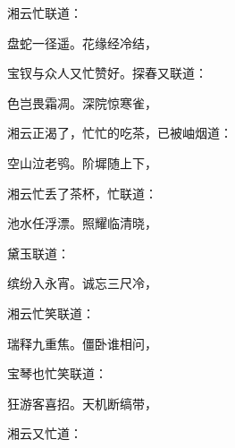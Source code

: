 \begin{parag}
    湘云忙联道：
\end{parag}
\begin{poem}
    \begin{pl} 盘蛇一径遥。花缘经冷结，\end{pl}
\end{poem}
\begin{parag}
    宝钗与众人又忙赞好。探春又联道：
\end{parag}
\begin{poem}
    \begin{pl} 色岂畏霜凋。深院惊寒雀，\end{pl}
\end{poem}
\begin{parag}
    湘云正渴了，忙忙的吃茶，已被岫烟道：
\end{parag}
\begin{poem}
    \begin{pl} 空山泣老鸮。阶墀随上下，\end{pl}
\end{poem}
\begin{parag}
    湘云忙丢了茶杯，忙联道：
\end{parag}
\begin{poem}
    \begin{pl} 池水任浮漂。照耀临清晓，\end{pl}
\end{poem}
\begin{parag}
    黛玉联道：
\end{parag}
\begin{poem}
    \begin{pl} 缤纷入永宵。诚忘三尺冷，\end{pl}
\end{poem}
\begin{parag}
    湘云忙笑联道：
\end{parag}
\begin{poem}
    \begin{pl} 瑞释九重焦。僵卧谁相问，\end{pl}
\end{poem}
\begin{parag}
    宝琴也忙笑联道：
\end{parag}
\begin{poem}
    \begin{pl} 狂游客喜招。天机断缟带，\end{pl}
\end{poem}
\begin{parag}
    湘云又忙道：
\end{parag}
